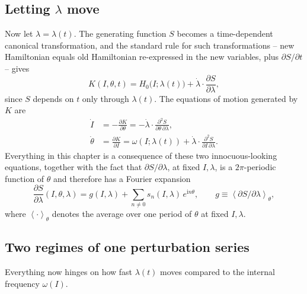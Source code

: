 \documentclass[11pt]{book}
\newcommand{\ii}{\mathrm{i}}
\newcommand{\avg}[1]{\left\langle #1 \right\rangle}
\begin{document}
\subsection{Letting $\lambda$ move}

Now let $\lambda = \lambda(t)$. The generating function $S$ becomes a time-dependent canonical
transformation, and the standard rule for such transformations -- new Hamiltonian equals old
Hamiltonian re-expressed in the new variables, plus $\partial S/\partial t$ -- gives
\begin{equation}
K(I,\theta,t) = H_0\big(I;\lambda(t)\big) + \dot\lambda \cdot \frac{\partial S}{\partial\lambda},
\label{eq:newham}
\end{equation}
since $S$ depends on $t$ only through $\lambda(t)$. The equations of motion generated by $K$ are
\begin{align}
\dot I &= -\frac{\partial K}{\partial\theta} = -\dot\lambda\cdot
\frac{\partial^2 S}{\partial\theta\,\partial\lambda}, \label{eq:Idot}\\[2mm]
\dot\theta &= \frac{\partial K}{\partial I} = \omega(I;\lambda(t)) + \dot\lambda\cdot
\frac{\partial^2 S}{\partial I\,\partial\lambda}. \label{eq:thetadot}
\end{align}
Everything in this chapter is a consequence of these two innocuous-looking equations, together
with the fact that $\partial S/\partial\lambda$, at fixed $I,\lambda$, is a $2\pi$-periodic
function of $\theta$ and therefore has a Fourier expansion
\begin{equation}
\frac{\partial S}{\partial\lambda}(I,\theta,\lambda) = g(I,\lambda) + \sum_{n\neq 0}
s_n(I,\lambda)\, e^{\ii n\theta}, \qquad g \equiv \avg{\partial S/\partial\lambda}_\theta,
\label{eq:fourier}
\end{equation}
where $\avg{\cdot}_\theta$ denotes the average over one period of $\theta$ at fixed $I,\lambda$.

\subsection{Two regimes of one perturbation series}
\label{sec:tworegimes}

Everything now hinges on how fast $\lambda(t)$ moves compared to the internal frequency
$\omega(I)$.
\end{document}
